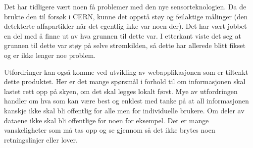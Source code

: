 Det har tidligere vært noen få problemer med den nye sensorteknologien. Da de brukte den til forsøk i CERN, kunne det oppstå støy og feilaktige målinger (den detekterte alfapartikler når det egentlig ikke var noen der). Det har vært jobbet en del med å finne ut av hva grunnen til dette var. I etterkant viste det seg at grunnen til dette var støy på selve strømkilden, så dette har allerede blitt fikset og er ikke lenger noe problem.

Utfordringer kan også komme ved utvikling av webapplikasjonen som er tiltenkt dette produktet. Her er det mange spørsmål i forhold til om informasjonen skal lastet rett opp på skyen, om det skal legges lokalt først. Mye av utfordringen handler om hva som kan være best og enklest med tanke på at all informasjonen kanskje ikke skal bli offentlig for alle men for individuelle brukere. Om deler av dataene ikke skal bli offentlige for noen for eksempel. Det er mange vanskeligheter som må tas opp og se gjennom så det ikke brytes noen retningslinjer eller lover.
